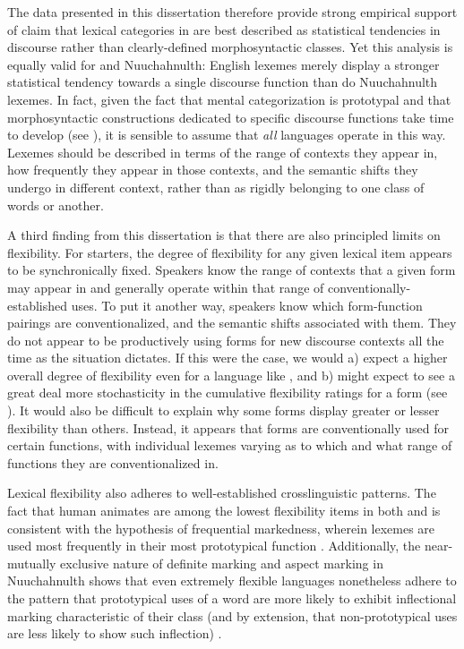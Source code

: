 The data presented in this dissertation therefore provide strong empirical support of  claim that lexical categories in  are best described as statistical tendencies in discourse rather than clearly-defined morphosyntactic classes. Yet this analysis is equally valid for  and Nuuchahnulth: English lexemes merely display a stronger statistical tendency towards a single discourse function than do Nuuchahnulth lexemes. In fact, given the fact that mental categorization is prototypal and that morphosyntactic constructions dedicated to specific discourse functions take time to develop (see ), it is sensible to assume that \emph{all} languages operate in this way. Lexemes should be described in terms of the range of contexts they appear in, how frequently they appear in those contexts, and the semantic shifts they undergo in different context, rather than as rigidly belonging to one class of words or another.

A third finding from this dissertation is that there are also principled limits on flexibility. For starters, the degree of flexibility for any given lexical item appears to be synchronically fixed. Speakers know the range of contexts that a given form may appear in and generally operate within that range of conventionally-established uses. To put it another way, speakers know which form-function pairings are conventionalized, and the semantic shifts associated with them. They do not appear to be productively using forms for new discourse contexts all the time as the situation dictates. If this were the case, we would a) expect a higher overall degree of flexibility even for a language like , and b) might expect to see a great deal more stochasticity in the cumulative flexibility ratings for a form (see ). It would also be difficult to explain why some forms display greater or lesser flexibility than others. Instead, it appears that forms are conventionally used for certain functions, with individual lexemes varying as to which and what range of functions they are conventionalized in.

Lexical flexibility also adheres to well-established crosslinguistic patterns. The fact that human animates are among the lowest flexibility items in both  and  is consistent with the hypothesis of frequential markedness, wherein lexemes are used most frequently in their most prototypical function \parencites{Croft1991}{Croft2000}{Croft2001b}{CroftLier2012}. Additionally, the near-mutually exclusive nature of definite marking and aspect marking in Nuuchahnulth shows that even extremely flexible languages nonetheless adhere to the pattern that prototypical uses of a word are more likely to exhibit inflectional marking characteristic of their class (and by extension, that non-prototypical uses are less likely to show such inflection) \parencite{HopperThompson1984}.

